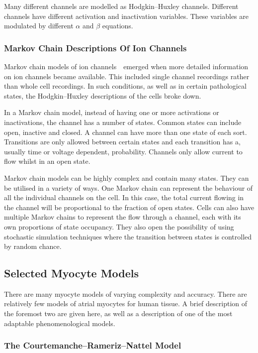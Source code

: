Many different channels are modelled as Hodgkin--Huxley channels.
Different channels have different activation and inactivation variables.
These variables are modulated by different $\alpha$ and $\beta$ equations.

\subsubsection{Markov Chain Descriptions Of Ion Channels}

Markov chain models of ion channels~\cite{Balser1990,Clancy1999,Silva2005}\
emerged when more detailed information on ion channels became
available.
This included single channel recordings rather than whole cell recordings.
In such conditions, as well as in certain pathological states, the
Hodgkin--Huxley descriptions of the cells broke down.

In a Markov chain model, instead of having one or more activations or
inactivations, the channel has a number of states.
Common states can include open, inactive and closed.
A channel can have more than one state of each sort.
Transitions are only allowed between certain states and each transition has a,
usually time or voltage dependent, probability.
Channels only allow current to flow whilst in an open state.

Markov chain models can be highly complex and contain many states.
They can be utilised in a variety of ways.
One Markov chain can represent the behaviour of all the individual channels on
the cell.
In this case, the total current flowing in the channel will be proportional to
the fraction of open states.
Cells can also have multiple Markov chains to represent the flow through a
channel, each with its own proportions of state occupancy.
They also open the possibility of using stochastic simulation techniques where
the transition between states is controlled by random chance.

\subsection{Selected Myocyte Models}

There are many myocyte models of varying complexity and
accuracy.
There are relatively few models of atrial myocytes for human tissue.
A brief description of the foremost two are given here, as well as a description
of one of the most adaptable phenomenological models.

\subsubsection{The Courtemanche--Rameriz--Nattel Model}
\label{sec:intro:math:crn}

